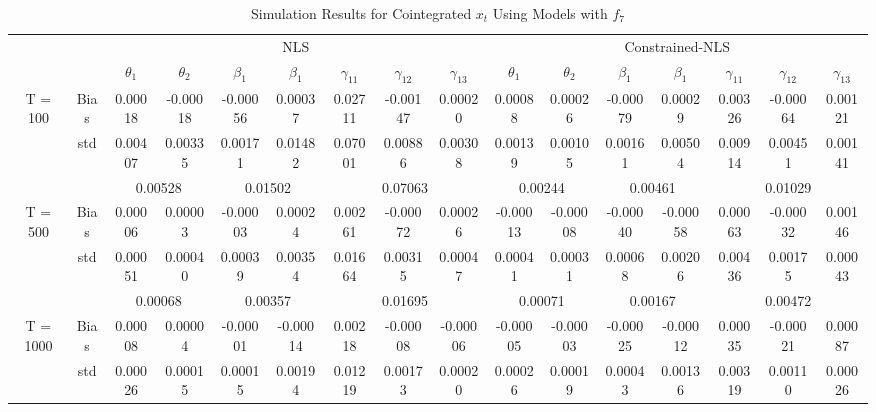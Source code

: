 \documentclass[a4paper,12pt,times,numbered,print,index]{report}
\numberwithin{equation}{section}
\begin{document}
\begin{table}[htbp]
  \centering
  \caption{Simulation Results for Cointegrated $x_t$ Using Models with $f_7$}
    \begin{adjustbox}{max width=\textwidth}
    \begin{tabular}{cccccccccccccccc}
    \toprule
        &       & \multicolumn{7}{c}{NLS}                               & \multicolumn{7}{c}{Constrained-NLS} \\
		&       & $\theta_1$ & $\theta_2$ & $\beta_1$  & $\beta_1$  & $\gamma_{11}$ & $\gamma_{12}$ & $\gamma_{13}$ & $\theta_1$ & $\theta_2$ & $\beta_1$  & $\beta_1$  & $\gamma_{11}$ & $\gamma_{12}$ & $\gamma_{13}$ \\
    \midrule
    \multirow{3}[1]{*}{T = 100} & Bias  & 0.00018 & -0.00018 & \textcolor[rgb]{ 0,  .439,  .753}{-0.00056} & 0.00037 & 0.02711 & -0.00147 & 0.00020 & 0.00088 & 0.00026 & \textcolor[rgb]{ 0,  .439,  .753}{-0.00079} & 0.00029 & 0.00326 & -0.00064 & 0.00121 \\
          & std   & 0.00407 & 0.00335 & 0.00171 & 0.01482 & 0.07001 & 0.00886 & 0.00308 & 0.00139 & 0.00105 & 0.00161 & 0.00504 & 0.00914 & 0.00451 & 0.00141 \\
          &       & \multicolumn{2}{c}{0.00528} & \multicolumn{2}{c}{0.01502} & \multicolumn{3}{c}{0.07063} & \multicolumn{2}{c}{0.00244} & \multicolumn{2}{c}{0.00461} & \multicolumn{3}{c}{0.01029} \\
    \multirow{3}[0]{*}{T = 500} & Bias  & 0.00006 & 0.00003 & \textcolor[rgb]{ 0,  .439,  .753}{-0.00003} & 0.00024 & 0.00261 & -0.00072 & 0.00026 & -0.00013 & -0.00008 & \textcolor[rgb]{ 0,  .439,  .753}{-0.00040} & -0.00058 & 0.00063 & -0.00032 & 0.00146 \\
          & std   & 0.00051 & 0.00040 & 0.00039 & 0.00354 & 0.01664 & 0.00315 & 0.00047 & 0.00041 & 0.00031 & 0.00068 & 0.00206 & 0.00436 & 0.00175 & 0.00043 \\
          &       & \multicolumn{2}{c}{0.00068} & \multicolumn{2}{c}{0.00357} & \multicolumn{3}{c}{0.01695} & \multicolumn{2}{c}{0.00071} & \multicolumn{2}{c}{0.00167} & \multicolumn{3}{c}{0.00472} \\
    \multirow{3}[1]{*}{T = 1000} & Bias  & 0.00008 & 0.00004 & \textcolor[rgb]{ 0,  .439,  .753}{-0.00001} & -0.00014 & 0.00218 & -0.00008 & -0.00006 & -0.00005 & -0.00003 & \textcolor[rgb]{ 0,  .439,  .753}{-0.00025} & -0.00012 & 0.00035 & -0.00021 & 0.00087 \\
          & std   & 0.00026 & 0.00015 & 0.00015 & 0.00194 & 0.01219 & 0.00173 & 0.00020 & 0.00026 & 0.00019 & 0.00043 & 0.00136 & 0.00319 & 0.00110 & 0.00026 \\

\end{tabular}
\end{adjustbox}
\end{table}
\end{document}

